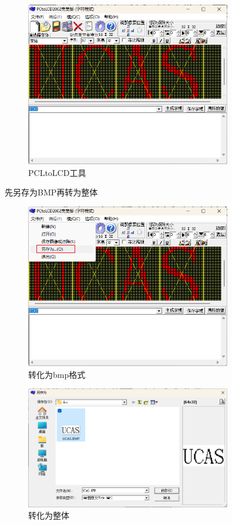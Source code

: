 \documentclass[UTF8]{article}
\theoremstyle{MyLineTheoremStyle} %
\theoremstyle{MyBlockTheoremStyle} %
\theoremstyle{MySubsubsectionStyle} %
\begin{document}
\begin{figure}[H]
    \centering
    \includegraphics[width=0.8\textwidth]{PCLtoLCD3.png}
    \caption{PCLtoLCD工具}
    \label{fig:PCLtoLCD工具3}
\end{figure}


先另存为BMP再转为整体
\begin{figure}[H]
    \centering
    \includegraphics[width=0.8\textwidth]{bmp1.png}
    \caption{转化为bmp格式}
    \label{fig:转化为bmp格式}
\end{figure}

\begin{figure}[H]
    \centering
    \includegraphics[width=0.8\textwidth]{bmp2.png}
    \caption{转化为整体}
    \label{fig:转化为整体}
\end{figure}
\end{document}
